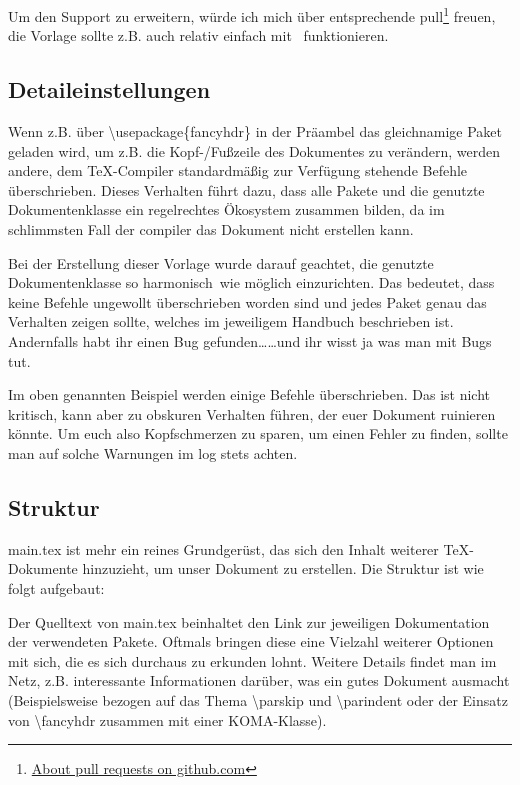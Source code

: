 Um den Support zu erweitern, würde ich mich über entsprechende \gls{pull}\footnote{\href{https://help.github.com/en/articles/about-pull-requests}{About pull requests on github.com}} freuen, die Vorlage sollte z.B. auch relativ einfach mit \ funktionieren.%
\subsection{Detaileinstellungen}%
\label{detail-grundl}
Wenn z.B. über \textbackslash usepackage\{fancyhdr\} in der Präambel das gleichnamige Paket geladen wird, um z.B. die Kopf-/Fußzeile des Dokumentes zu verändern, werden andere, dem \TeX{}-Compiler standardmäßig zur Verfügung stehende Befehle überschrieben. Dieses Verhalten führt dazu, dass alle Pakete und die genutzte Dokumentenklasse ein regelrechtes Ökosystem zusammen bilden, da im schlimmsten Fall der \gls{compiler} das Dokument nicht erstellen kann.

Bei der Erstellung dieser Vorlage wurde darauf geachtet, die genutzte Dokumentenklasse so \glqq harmonisch\grqq\ wie möglich einzurichten. Das bedeutet, dass keine Befehle ungewollt überschrieben worden sind und jedes Paket genau das Verhalten zeigen sollte, welches im jeweiligem Handbuch beschrieben ist. Andernfalls habt ihr einen Bug gefunden\dots \dots und ihr wisst ja was man mit Bugs tut.

Im oben genannten Beispiel werden einige Befehle überschrieben. Das ist nicht kritisch, kann aber zu obskuren Verhalten führen, der euer Dokument ruinieren könnte. Um euch also Kopfschmerzen zu sparen, um einen Fehler zu finden, sollte man auf solche Warnungen im log stets achten.%
\subsection{Struktur}%
main.tex ist mehr ein reines Grundgerüst, das sich den Inhalt weiterer \TeX{}-Dokumente hinzuzieht, um unser Dokument zu erstellen. Die Struktur ist wie folgt aufgebaut:



Der Quelltext von main.tex beinhaltet den Link zur jeweiligen Dokumentation der verwendeten Pakete. Oftmals bringen diese eine Vielzahl weiterer Optionen mit sich, die es sich durchaus zu erkunden lohnt.
Weitere Details findet man im Netz, z.B. interessante Informationen darüber, was ein gutes Dokument ausmacht (Beispielsweise bezogen auf das Thema \textbackslash parskip und \textbackslash parindent oder der Einsatz von \textbackslash fancyhdr zusammen mit einer KOMA-Klasse).%
